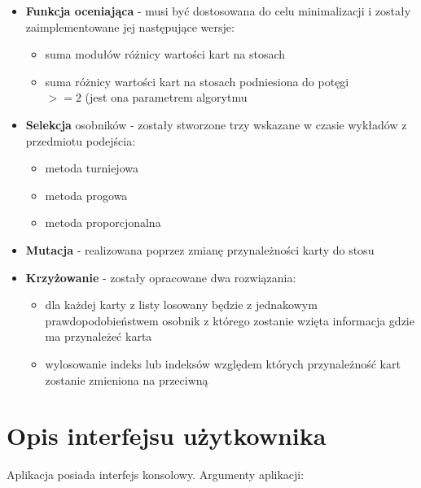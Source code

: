 \documentclass[12pt]{article}
\begin{document}
\begin{itemize}
	\item{\textbf{Funkcja oceniająca} - musi być dostosowana do celu minimalizacji i zostały zaimplementowane jej następujące wersje:
		\begin{itemize}
			\item{suma modułów różnicy wartości kart na stosach} 
			\item{suma różnicy wartości kart na stosach podniesiona do potęgi \\ $>=2$ (jest ona parametrem algorytmu} 
		\end{itemize} 
	}
	\item{\textbf{Selekcja} osobników - zostały stworzone trzy wskazane w czasie wykładów z przedmiotu podejścia:
		\begin{itemize}
			\item{metoda turniejowa}
			\item{metoda progowa}
			\item{metoda proporcjonalna}
		\end{itemize}
	}
	\item{\textbf{Mutacja} - realizowana poprzez zmianę przynależności karty do stosu}
	\item{\textbf{Krzyżowanie} - zostały opracowane dwa rozwiązania:
		\begin{itemize}
			\item{dla każdej karty z listy losowany będzie z jednakowym prawdopodobieństwem osobnik z którego zostanie wzięta informacja gdzie ma przynależeć karta}
			\item{wylosowanie indeks lub indeksów względem których przynależność kart zostanie zmieniona na przeciwną}
		\end{itemize}			
		} 
\end{itemize}

\section{Opis interfejsu użytkownika}
Aplikacja posiada interfejs konsolowy. Argumenty aplikacji:
\end{document}
